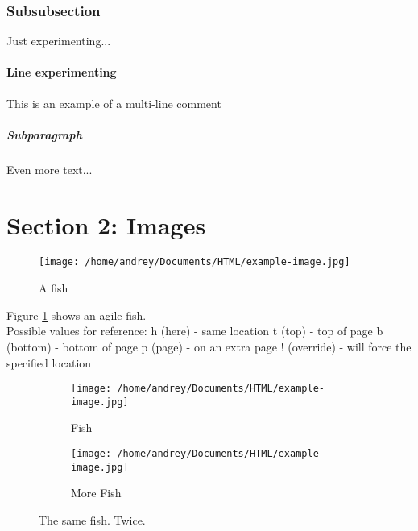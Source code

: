 \documentclass{article}
\begin{document}
\subsubsection{Subsubsection}

Just experimenting...

\paragraph{Line experimenting}
This is an example of a multi-line comment

\begin{comment}
\\ start a new paragraph.
\- OK to hyphenate a word here.
\cleardoublepage flush all material and start a new page, start new odd numbered page.
\clearpage plush all material and start a new page.
\hyphenation enter a sequence pf exceptional hyphenations.
\linebreak allow to break the line here.
\newline request a new line.
\newpage request a new page.
\nolinebreak no line break should happen here.
\nopagebreak no page break should happen here.
\pagebreak encourage page break.
\end{comment}

\subparagraph{Subparagraph}

Even more text...

\newpage %

\section{Section 2: Images}

\begin{figure}[h!]
  \texttt{[image: /home/andrey/Documents/HTML/example-image.jpg]} %
  \caption{A fish} %
  \label{fig:fish1} %
\end{figure}

Figure \ref{fig:fish1} shows an agile fish.\\ %

Possible values for reference: 
h (here) - same location
t (top) - top of page
b (bottom) - bottom of page
p (page) - on an extra page
! (override) - will force the specified location

\begin{figure}[h!]
  \centering
  \begin{subfigure}[b]{0.4\linewidth}
    \texttt{[image: /home/andrey/Documents/HTML/example-image.jpg]}
    \caption{Fish}
  \end{subfigure}
  \begin{subfigure}[b]{0.4\linewidth}
    \texttt{[image: /home/andrey/Documents/HTML/example-image.jpg]}
    \caption{More Fish}
  \end{subfigure}
  \caption{The same fish. Twice.}
  \label{fig:fish}
\end{figure}
\end{document}
